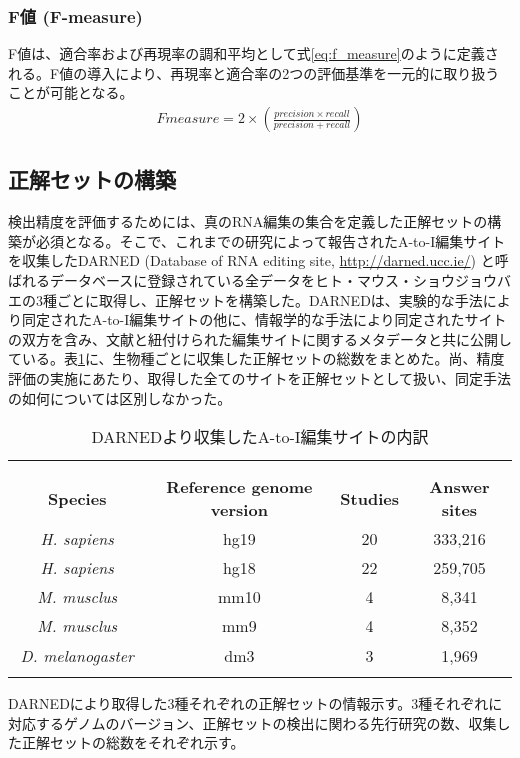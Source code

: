 \subsubsection{F値 (F-measure)}
F値は、適合率および再現率の調和平均として式\ref{eq:f_measure}のように定義される。F値の導入により、再現率と適合率の2つの評価基準を一元的に取り扱うことが可能となる。
\begin{eqnarray}
	Fmeasure = 2 \times \left( \frac{precision \times recall}{precision + recall} \right)
	\label{eq:f_measure}
\end{eqnarray}

\subsection{正解セットの構築}
検出精度を評価するためには、真のRNA編集の集合を定義した正解セットの構築が必須となる。そこで、これまでの研究によって報告されたA-to-I編集サイトを収集したDARNED (Database of RNA editing site, \url{http://darned.ucc.ie/}) \citep{Kiran:2010aa}と呼ばれるデータベースに登録されている全データをヒト・マウス・ショウジョウバエの3種ごとに取得し、正解セットを構築した。DARNEDは、実験的な手法により同定されたA-to-I編集サイトの他に、情報学的な手法により同定されたサイトの双方を含み、文献と紐付けられた編集サイトに関するメタデータと共に公開している。表\ref{tab:darned}に、生物種ごとに収集した正解セットの総数をまとめた。尚、精度評価の実施にあたり、取得した全てのサイトを正解セットとして扱い、同定手法の如何については区別しなかった。

\begin{longtable}{cccc}
	\vspace{-0.5cm}
	\label{tab:darned}\\
	\caption{DARNEDより収集したA-to-I編集サイトの内訳}\\
	\cline{1-4}
	\textbf{Species} & \textbf{Reference genome version} & \textbf{Studies} & \textbf{Answer sites} \\
	\cline{1-4}
	\textit{H. sapiens} & hg19 & 20 & 333,216 \\
	\textit{H. sapiens} & hg18 & 22 & 259,705 \\
	\textit{M. musclus} & mm10 & 4 & 8,341 \\
	\textit{M. musclus} & mm9  & 4 & 8,352 \\
	\textit{D. melanogaster}　& dm3 & 3 & 1,969 \\
	\cline{1-4}
	\vspace{-0.8cm}
\end{longtable}
\begin{flushleft}
	\small{DARNEDにより取得した3種それぞれの正解セットの情報示す。3種それぞれに対応するゲノムのバージョン、正解セットの検出に関わる先行研究の数、収集した正解セットの総数をそれぞれ示す。}
\end{flushleft}

